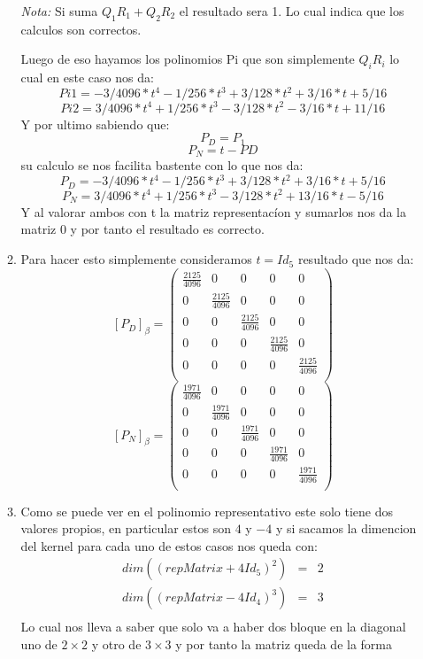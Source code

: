 \documentclass[12pt]{exam}
\begin{document}
\begin{enumerate}
\begin{enumerate}
    \textit{Nota:} Si suma $Q_1R_1+Q_2R_2$ el resultado sera 1. Lo cual indica que los calculos son correctos.

    Luego de eso hayamos los polinomios Pi que  son simplemente $Q_iR_i$ lo cual en este caso nos da:
    $$Pi1 = -3/4096*t^4 - 1/256*t^3 + 3/128*t^2 + 3/16*t + 5/16$$
    $$Pi2 = 3/4096*t^4 + 1/256*t^3 - 3/128*t^2 - 3/16*t + 11/16$$
    Y por ultimo sabiendo que:
    $$P_D = P_1$$
    $$P_N = t - PD$$
    su calculo se nos facilita bastente con lo que nos da:
    $$P_D = -3/4096*t^4 - 1/256*t^3 + 3/128*t^2 + 3/16*t + 5/16$$
    $$P_N = 3/4096*t^4 + 1/256*t^3 - 3/128*t^2 + 13/16*t - 5/16$$
    Y al valorar ambos con t la matriz representacíon y sumarlos nos da la matriz 0 y por tanto el resultado es correcto.
    \item Para hacer esto simplemente consideramos $t = Id_5$ resultado que nos da:
    $$[P_D]_\beta = \begin{pmatrix}
        \frac{2125}{4096} & 0 & 0 & 0 & 0 \\
0 & \frac{2125}{4096} & 0 & 0 & 0 \\
0 & 0 & \frac{2125}{4096} & 0 & 0 \\
0 & 0 & 0 & \frac{2125}{4096} & 0 \\
0 & 0 & 0 & 0 & \frac{2125}{4096} \\
    \end{pmatrix}$$
    $$[P_N]_\beta = \begin{pmatrix}
        \frac{1971}{4096} & 0 & 0 & 0 & 0 \\
0 & \frac{1971}{4096} & 0 & 0 & 0 \\
0 & 0 & \frac{1971}{4096} & 0 & 0 \\
0 & 0 & 0 & \frac{1971}{4096} & 0 \\
0 & 0 & 0 & 0 & \frac{1971}{4096} \\
    \end{pmatrix}$$
    \item Como se puede ver en el polinomio representativo este solo tiene dos valores propios, en particular estos son $4$ y $-4$ y si sacamos la dimencion del
    kernel para cada uno de estos casos nos queda con:
    \begin{eqnarray}
        dim((repMatrix+4Id_5)^2) & = & 2\\
        dim((repMatrix-4Id_4)^3) & = & 3\\
    \end{eqnarray}
    Lo cual nos lleva a saber que solo va a haber dos bloque en la diagonal uno de $2\times 2$ y otro de $3 \times 3$ y por tanto la matriz queda de la forma

\end{enumerate}
\end{enumerate}
\end{document}
